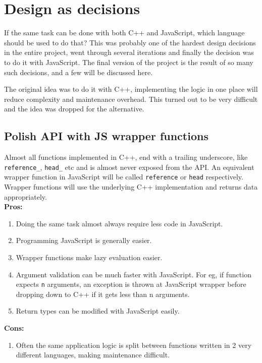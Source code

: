 \section{Design as  decisions}

If the same task can be done with both C++ and JavaScript, which language should
be used to do that? This was probably one of the hardest design decisions in the
entire project, went through several iterations and finally the decision was to
do it with JavaScript. The final version of the project is the result of so many
such decisions, and a few will be discussed here.

The original idea was to do it with C++, implementing the logic in one place
will reduce complexity and maintenance overhead. This turned out to be very
difficult and the idea was dropped for the alternative.

\subsection{Polish API with JS wrapper functions}

Almost all functions implemented in C++, end with a trailing underscore, like
\texttt{reference\_}, \texttt{head\_} etc and is almost never exposed from the
API. An equivalent wrapper function in JavaScript will be called \texttt{reference} or
\texttt{head} respectively. Wrapper functions will use the underlying C++
implementation and returns data appropriately. \\

\textbf{Pros:}
\begin{enumerate}

	\item Doing the same task almost always require less code in JavaScript.
    \item Programming JavaScript is generally easier.
    \item Wrapper functions make lazy evaluation easier.
    \item Argument validation can be much faster with JavaScript. For eg, if function
      expects \texttt{n} arguments, an exception is thrown at JavaScript wrapper
      before dropping down to C++ if it gets less than n arguments.
    \item Return types can be modified with JavaScript easily.

\end{enumerate}

\textbf{Cons:}
\begin{enumerate}

	\item Often the same application logic is split between functions written in 2
      very different languages, making maintenance difficult.

\end{enumerate}

